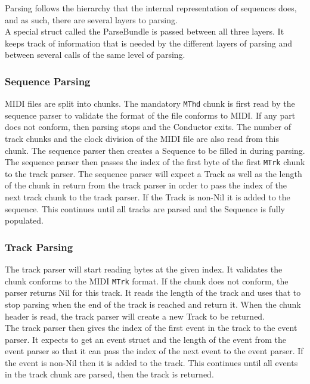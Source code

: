 \documentclass{article}
\begin{document}
\noindent Parsing follows the hierarchy that the internal representation of sequences does, and as such, there are several layers to parsing.\\

\noindent A special struct called the ParseBundle is passed between all three layers. It keeps track of information that is needed by the different layers of parsing and between several calls of the same level of parsing.

\subsubsection{Sequence Parsing}
\noindent MIDI files are split into chunks. The mandatory \verb"MThd" chunk is first read by the sequence parser to validate the format of the file conforms to MIDI. If any part does not conform, then parsing stops and the Conductor exits. The number of track chunks and the clock division of the MIDI file are also read from this chunk. The sequence parser then creates a Sequence to be filled in during parsing.\\

\noindent The sequence parser then passes the index of the first byte of the first \verb"MTrk" chunk to the track parser. The sequence parser will expect a Track as well as the length of the chunk in return from the track parser in order to pass the index of the next track chunk to the track parser. If the Track is non-Nil it is added to the sequence. This continues until all tracks are parsed and the Sequence is fully populated.

\subsubsection{Track Parsing}
\noindent The track parser will start reading bytes at the given index. It validates the chunk conforms to the MIDI \verb"MTrk" format. If the chunk does not conform, the parser returns Nil for this track. It reads the length of the track and uses that to stop parsing when the end of the track is reached and return it. When the chunk header is read, the track parser will create a new Track to be returned.\\

\noindent The track parser then gives the index of the first event in the track to the event parser. It expects to get an event struct and the length of the event from the event parser so that it can pass the index of the next event to the event parser. If the event is non-Nil then it is added to the track. This continues until all events in the track chunk are parsed, then the track is returned.
\end{document}
